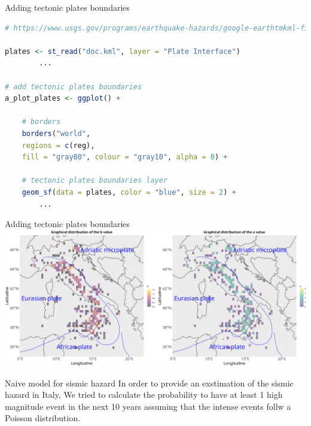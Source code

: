 \documentclass[aspectratio=43]{beamer}
\begin{document}
	
\begin{frame}[fragile]{Adding tectonic plates boundaries}
	\begin{lstlisting}[language=R, basicstyle=\ttfamily\scriptsize]
# https://www.usgs.gov/programs/earthquake-hazards/google-earthtmkml-files -> page where you can find the file for the edge of the plates
		
plates <- st_read("doc.kml", layer = "Plate Interface")
		...
		
# add tectonic plates boundaries
a_plot_plates <- ggplot() +

	# borders
	borders("world", 
	regions = c(reg), 
	fill = "gray80", colour = "gray10", alpha = 0) +
			
	# tectonic plates boundaries layer
	geom_sf(data = plates, color = "blue", size = 2) +
		...
	\end{lstlisting}
\end{frame}
	

\begin{frame}{Adding tectonic plates boundaries}
	\centering
	\includegraphics[width=1\textwidth]{EQ_images/G_R_parameters_plates.png} \\
\end{frame}

\begin{frame}{Naive model for sismic hazard}
	\centering
	In order to provide an exstimation of the sismic hazard in Italy, We tried to calculate the probability to have at least 1 high magnitude event in the next 10 years assuming that the intense events follw a Poisson distribution.  
\end{frame}
\end{document}
